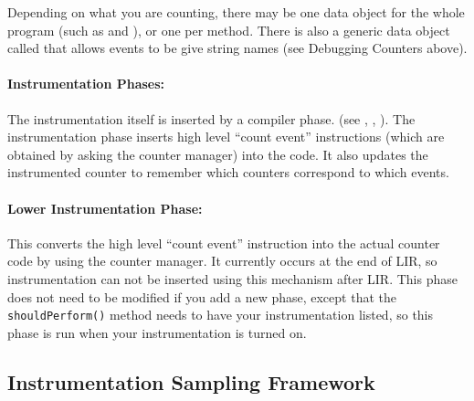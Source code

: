 
Depending on what you are counting, there may be one data object for
the whole program (such as 
 and
), 
or one per method.  There is also a
generic data object called 
that
allows events to be give string names (see Debugging Counters above).

\paragraph{Instrumentation Phases:}  The instrumentation itself is
inserted by a compiler phase.  (see
,
,
).  The instrumentation phase
inserts high level ``count event'' instructions (which are obtained by
asking the counter manager) into the code.  It also updates the
instrumented counter to remember which counters correspond to which
events.

\paragraph{Lower Instrumentation Phase:}  This 
converts the high level ``count event'' instruction into the actual
counter code by using the counter manager.  It currently occurs at the
end of LIR, so instrumentation can not be inserted using this
mechanism after LIR.  This phase does not need to be modified if you
add a new phase, except that the {\tt shouldPerform()} method needs to
have your instrumentation listed, so this phase is run when your
instrumentation is turned on.

\subsection{Instrumentation Sampling Framework}
\label{instrumentation_sampling}

